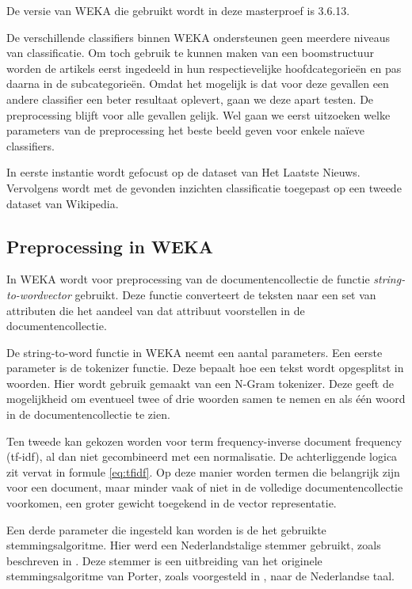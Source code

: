 De versie van WEKA die gebruikt wordt in deze masterproef is 3.6.13.

De verschillende classifiers binnen WEKA ondersteunen geen meerdere niveaus van classificatie. Om toch gebruik te kunnen maken van een boomstructuur worden de artikels eerst ingedeeld in hun respectievelijke hoofdcategorie\"en en pas daarna in de subcategorie\"en. Omdat het mogelijk is dat voor deze gevallen een andere classifier een beter resultaat oplevert, gaan we deze apart testen. De preprocessing blijft voor alle gevallen gelijk. Wel gaan we eerst uitzoeken welke parameters van de preprocessing het beste beeld geven voor enkele na\"ieve classifiers. 

In eerste instantie wordt gefocust op de dataset van Het Laatste Nieuws. Vervolgens wordt met de gevonden inzichten classificatie toegepast op een tweede dataset van Wikipedia. 

\subsection{Preprocessing in WEKA}
In WEKA wordt voor preprocessing van de documentencollectie de functie \textit{string-to-wordvector} gebruikt. Deze functie converteert de teksten naar een set van attributen die het aandeel van dat attribuut voorstellen in de documentencollectie. 

De string-to-word functie in WEKA neemt een aantal parameters. Een eerste parameter is de tokenizer functie. Deze bepaalt hoe een tekst wordt opgesplitst in woorden. Hier wordt gebruik gemaakt van een N-Gram tokenizer. Deze geeft de mogelijkheid om eventueel twee of drie woorden samen te nemen en als \'e\'en woord in de documentencollectie te zien.

Ten tweede kan gekozen worden voor term frequency-inverse document frequency (tf-idf), al dan niet gecombineerd met een normalisatie. De achterliggende logica zit vervat in formule \ref{eq:tfidf}. Op deze manier worden termen die belangrijk zijn voor een document, maar minder vaak of niet in de volledige documentencollectie voorkomen, een groter gewicht toegekend in de vector representatie. 

Een derde parameter die ingesteld kan worden is de het gebruikte stemmingsalgoritme. Hier werd een Nederlandstalige stemmer gebruikt, zoals beschreven in \cite{Kraaij1994}. Deze stemmer is een uitbreiding van het originele stemmingsalgoritme van Porter, zoals voorgesteld in \cite{Porter1980}, naar de Nederlandse taal. 

